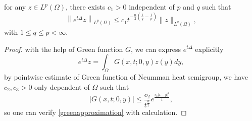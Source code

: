 \begin{lemma}
	for any $z\in L^p(\Omega)$, there exists $c_1>0$ independent of $p$ and $q$ such that
	\begin{equation}\label{greenapproximation}
		\left\|e^{t \Delta} z\right\|_{L^{p}(\Omega)} \leqslant c_{1} t^{-\frac{n}{2}\left(\frac{1}{q}-\frac{1}{p}\right)}\|z\|_{L^{q}(\Omega)},
	\end{equation}
with $1\leqslant q\leqslant p < \infty.$
\end{lemma}
\begin{proof}
	with the help of Green function $G$, we can express $e^{t\Delta}$ explicitly 
	\begin{equation}
		e^{t\Delta}z = \int_{\Omega}G(x,t;0,y)z(y)\mathit{d}y,
	\end{equation}
by pointwise estimate of Green function of Neumman heat semigroup, we have $c_2,c_3>0$ only dependent of $\Omega$ such that
\begin{equation}
	|G(x,t;0,y)| \leqslant \dfrac{c_2}{t^\frac{n}{2}}e^{\frac{c_3|x-y|^2}{t}},
\end{equation}
so one can verify \eqref{greenapproximation} with calculation.
\end{proof}


